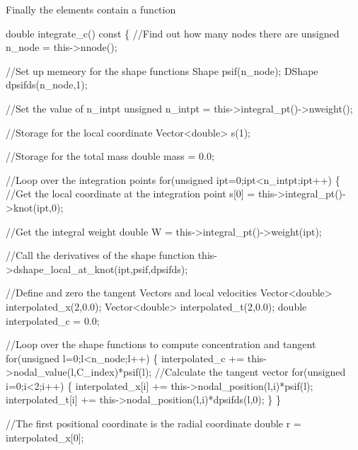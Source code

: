 Finally the elements contain a function 
\begin{DoxyCodeInclude}
 \textcolor{keywordtype}{double} integrate\_c() const
  \{
   \textcolor{comment}{//Find out how many nodes there are}
   \textcolor{keywordtype}{unsigned} n\_node = this->nnode();
   
   \textcolor{comment}{//Set up memeory for the shape functions}
   Shape psif(n\_node);
   DShape dpsifds(n\_node,1);

   \textcolor{comment}{//Set the value of n\_intpt}
   \textcolor{keywordtype}{unsigned} n\_intpt = this->integral\_pt()->nweight();
   
   \textcolor{comment}{//Storage for the local coordinate}
   Vector<double> s(1);

   \textcolor{comment}{//Storage for the total mass}
   \textcolor{keywordtype}{double} mass = 0.0;
   
   \textcolor{comment}{//Loop over the integration points}
   \textcolor{keywordflow}{for}(\textcolor{keywordtype}{unsigned} ipt=0;ipt<n\_intpt;ipt++)
    \{
     \textcolor{comment}{//Get the local coordinate at the integration point}
     s[0] = this->integral\_pt()->knot(ipt,0);
     
     \textcolor{comment}{//Get the integral weight}
     \textcolor{keywordtype}{double} W = this->integral\_pt()->weight(ipt);
     
     \textcolor{comment}{//Call the derivatives of the shape function}
     this->dshape\_local\_at\_knot(ipt,psif,dpsifds);
     
     \textcolor{comment}{//Define and zero the tangent Vectors and local velocities}
     Vector<double> interpolated\_x(2,0.0);
     Vector<double> interpolated\_t(2,0.0);
     \textcolor{keywordtype}{double} interpolated\_c = 0.0;
     
     
     \textcolor{comment}{//Loop over the shape functions to compute concentration and tangent}
     \textcolor{keywordflow}{for}(\textcolor{keywordtype}{unsigned} l=0;l<n\_node;l++)
      \{
       interpolated\_c += this->nodal\_value(l,C\_index)*psif(l);
       \textcolor{comment}{//Calculate the tangent vector}
       \textcolor{keywordflow}{for}(\textcolor{keywordtype}{unsigned} i=0;i<2;i++)
        \{
         interpolated\_x[i] += this->nodal\_position(l,i)*psif(l);
         interpolated\_t[i] += this->nodal\_position(l,i)*dpsifds(l,0);
        \}
      \}
     
     \textcolor{comment}{//The first positional coordinate is the radial coordinate}
     \textcolor{keywordtype}{double} r = interpolated\_x[0];


\end{DoxyCodeInclude}
